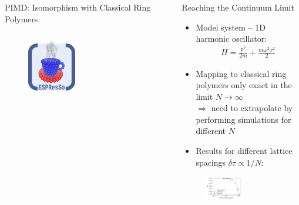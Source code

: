 \documentclass[final,hyperref={pdfpagelabels=false}]{beamer}
\begin{document}
\begin{frame}[t]
\begin{columns}[t]
\begin{column}{.48\textwidth}
\begin{block}{PIMD: Isomorphism with Classical Ring Polymers}
\begin{columns}[T,onlytextwidth]
	\vspace{2cm}
\begin{figure}[H]
\centering
\includegraphics[width=0.4\textwidth]{figures/logo-espresso.pdf}
\end{figure}
\end{columns}
\end{block}

\end{column} %


\begin{column}{.48\textwidth}

\begin{block}{Reaching the Continuum Limit}
\begin{itemize}
\item Model system -- 1D harmonic oscillator:
\begin{align*}
H = \frac{p^2}{2m} + \frac{m\omega^2x^2}{2}
\end{align*}
\item Mapping to classical ring polymers only exact in the limit $N\rightarrow \infty$\\
$\Rightarrow$ need to extrapolate by performing simulations for different $N$
\item Results for different lattice spacings $\delta\tau\propto 1/N$: 
\end{itemize}

\begin{figure}[H]
\centering
\includegraphics[width=0.5\textwidth]{figures/moments.pdf}
\end{figure}


\end{block}
\end{column}
\end{columns}
\end{frame}
\end{document}
